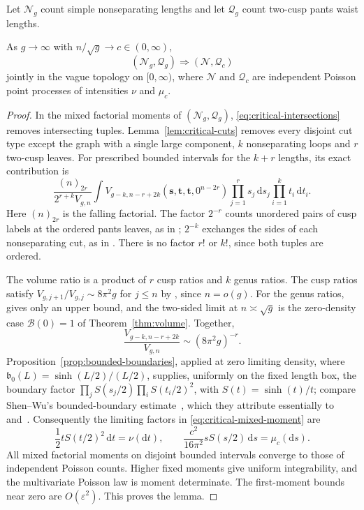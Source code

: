 Let $\mathcal N_g$ count simple nonseparating lengths and let
$\mathcal Q_g$ count two-cusp pants waist lengths.

\begin{lemma}\label{lem:critical-skeleton}
As $g\to\infty$ with $n/\sqrt g\to c\in(0,\infty)$,
\begin{equation}
 (\mathcal N_g,\mathcal Q_g)\Longrightarrow
 (\mathcal N,\mathcal Q_c)
 \label{eq:critical-skeleton}
\end{equation}
jointly in the vague topology on $[0,\infty)$, where $\mathcal N$ and
$\mathcal Q_c$ are independent Poisson point processes of intensities $\nu$
and $\mu_c$.
\end{lemma}

\begin{proof}
In the mixed
factorial moments of $(\mathcal N_g,\mathcal Q_g)$, \eqref{eq:critical-intersections} removes intersecting
tuples. Lemma~\ref{lem:critical-cuts} removes every disjoint cut type
except the graph with a single large component, $k$ nonseparating
loops and $r$ two-cusp leaves. For prescribed bounded intervals for
the $k+r$ lengths, its exact contribution is
\begin{equation}
 \frac{(n)_{2r}}{2^{r+k}V_{g,n}}
 \int V_{g-k,n-r+2k}(\mathbf s,\mathbf t,\mathbf t,0^{n-2r})
        \prod_{j=1}^r s_j\,\mathrm ds_j
        \prod_{i=1}^k t_i\,\mathrm dt_i.
 \label{eq:critical-mixed-moment}
\end{equation}
Here $(n)_{2r}$ is the falling factorial. The factor $2^{-r}$ counts
unordered pairs of cusp labels at the ordered pants leaves, as in
\cite[Lemma~28]{SW}; $2^{-k}$ exchanges the sides of each
nonseparating cut, as in \cite[Proposition~4.2]{MP}. There is no
factor $r!$ or $k!$, since both tuples are ordered.

The volume ratio is a product of $r$ cusp ratios and $k$ genus ratios.
The cusp ratios satisfy $V_{g,j+1}/V_{g,j}\sim8\pi^2g$ for $j\le n$ by
\cite[Lemma~5.1(ii)]{MZ}, since $n=o(g)$.
For the genus ratios, \cite[Lemma~5.1(iii)]{MZ} gives only an upper bound,
and the two-sided limit at $n\asymp\sqrt g$ is the zero-density case
$\mathcal B(0)=1$ of Theorem~\ref{thm:volume}. Together,
\[
 \frac{V_{g-k,n-r+2k}}{V_{g,n}}\sim(8\pi^2g)^{-r}.
\]
Proposition~\ref{prop:bounded-boundaries}, applied at zero limiting
density, where $\mathfrak b_0(L)=\sinh(L/2)/(L/2)$, supplies, uniformly
on the fixed length box, the boundary factor
$\prod_j S(s_j/2)\prod_i S(t_i/2)^2$, with $S(t)=\sinh(t)/t$; compare
Shen--Wu's bounded-boundary estimate~\cite[Proposition~25]{SW}, which
they attribute essentially to \cite[Proposition~3.1]{MP}
and~\cite[Lemma~20]{NWX}.
Consequently the limiting factors in \eqref{eq:critical-mixed-moment}
are
\[
 \frac12 tS(t/2)^2\,\mathrm dt=\nu(\mathrm dt),\qquad
 \frac{c^2}{16\pi^2}sS(s/2)\,\mathrm ds=\mu_c(\mathrm ds).
\]
All mixed factorial moments on disjoint bounded intervals converge to
those of independent Poisson counts. Higher fixed moments give uniform
integrability, and the multivariate Poisson law is moment determinate.
The first-moment bounds near zero are $O(\varepsilon^2)$. This proves the
lemma.
\end{proof}

